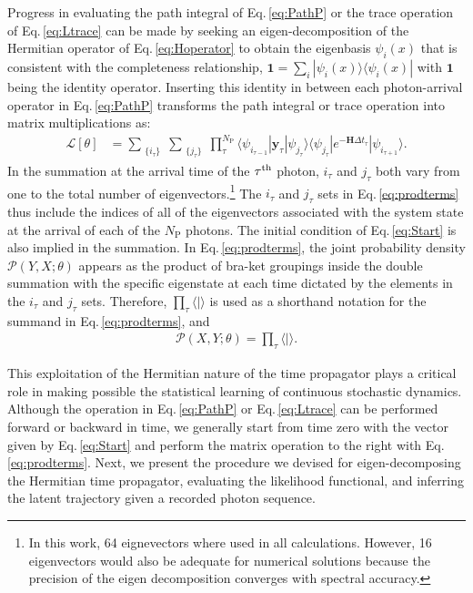 \documentclass[journal=jpcbfk,manuscript=article,layout=twocolumn,articletitle=true]{achemso}
\begin{document}
Progress in evaluating the path integral of Eq.\,\ref{eq:PathP} or the trace operation of Eq.\,\ref{eq:Ltrace} can be made by seeking an eigen-decomposition of the Hermitian operator of Eq.\,\ref{eq:Hoperator} to obtain the eigenbasis $\psi_i(x)$ that is consistent with the completeness relationship, $\bm{1} = \sum_i | \psi_i(x) \rangle \langle \psi_i(x) |$ with $\bm{1}$ being the identity operator. Inserting this identity in between each photon-arrival operator in Eq.\,\ref{eq:PathP} transforms the path integral or trace operation into matrix multiplications as:
\begin{align}
\label{eq:prodterms}
\mathcal{L}[\theta] &= \sum_{\substack{\{i_\tau\}}} \sum_{\substack{\{j_\tau\}}} \prod_{\tau}^{N_{\mathrm{P}}} \langle \psi_{i_{\tau-1}} | \bm{y}_{\tau} | \psi_{j_\tau} \rangle \langle \psi_{j_\tau} | e^{-\bm{H}\Delta t_{\tau}} | \psi_{i_{\tau+1}} \rangle.
\end{align}
In the summation at the arrival time of the $\tau^{\rm th}$ photon, $i_\tau$ and $j_\tau$ both vary from one to the total number of eigenvectors.\footnote{In this work, 64 eignevectors where used in all calculations. However, 16 eigenvectors would also be adequate for numerical solutions because the precision of the eigen decomposition converges with spectral accuracy.} The ${i_\tau}$ and ${j_\tau}$ sets in Eq.\,\ref{eq:prodterms} thus include the indices of all of the eigenvectors associated with the system state at the arrival of each of the $N_{\mathrm{P}}$ photons. The initial condition of Eq.\,\ref{eq:Start} is also implied in the summation. In Eq.\,\ref{eq:prodterms}, the joint probability density $\mathcal{P}(Y,X ; \theta)$ appears as the product of bra-ket groupings inside the double summation with the specific eigenstate at each time dictated by the elements in the ${i_\tau}$ and ${j_\tau}$ sets. Therefore, $\prod_{\tau} \langle |\rangle$ is used as a shorthand notation for the summand in Eq.\,\ref{eq:prodterms}, and 
\begin{align}
\label{eq:PiTau}
\mathcal{P}(X,Y ; \theta) = {\prod}_{\tau} \langle |\rangle. 
\end{align}

This exploitation of the Hermitian nature of the time propagator plays a critical role in making possible the statistical learning of continuous stochastic dynamics. Although the operation in Eq.\,\ref{eq:PathP} or Eq.\,\ref{eq:Ltrace} can be performed forward or backward in time, we generally start from time zero with the vector given by Eq.\,\ref{eq:Start} and perform the matrix operation to the right with Eq.\,\ref{eq:prodterms}. Next, we present the procedure we devised for eigen-decomposing the Hermitian time propagator, evaluating the likelihood functional, and inferring the latent trajectory given a recorded photon sequence.
\end{document}
